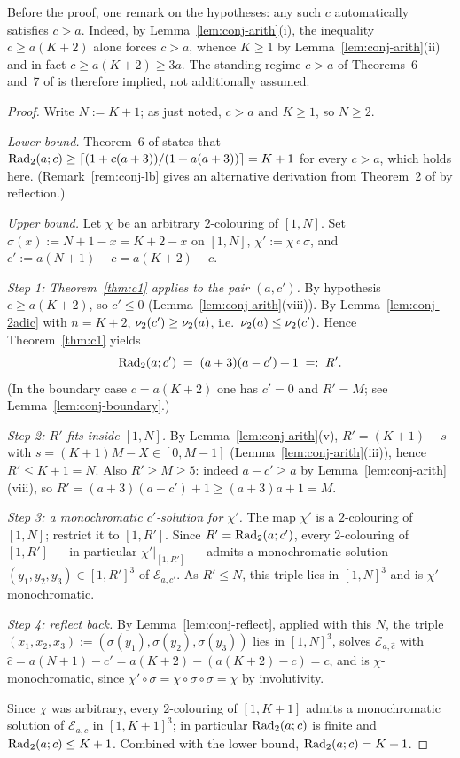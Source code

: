 Before the proof, one remark on the hypotheses: any such $c$ automatically
satisfies $c > a$. Indeed, by Lemma~\ref{lem:conj-arith}(i), the inequality
$c \ge a(K+2)$ alone forces $c > a$, whence $K \ge 1$ by
Lemma~\ref{lem:conj-arith}(ii) and in fact $c \ge a(K+2) \ge 3a$. The
standing regime $c > a$ of Theorems~6 and~7 of \cite{DT2020} is therefore
implied, not additionally assumed.

\begin{proof}
Write $N := K + 1$; as just noted, $c > a$ and $K \ge 1$, so $N \ge 2$.

\emph{Lower bound.} Theorem~6 of \cite{DT2020} states that
$\mathrm{Rad}_2(a;c) \ge \lceil (1 + c(a+3))/(1 + a(a+3)) \rceil = K + 1$ for every
$c > a$, which holds here. (Remark~\ref{rem:conj-lb} gives an alternative
derivation from Theorem~2 of \cite{DT2020} by reflection.)

\emph{Upper bound.} Let $\chi$ be an arbitrary $2$-colouring of $[1,N]$.
Set $\sigma(x) := N + 1 - x = K + 2 - x$ on $[1,N]$,
$\chi' := \chi \circ \sigma$, and $c' := a(N+1) - c = a(K+2) - c$.

\emph{Step 1: Theorem~\ref{thm:c1} applies to the pair $(a, c')$.} By
hypothesis $c \ge a(K+2)$, so $c' \le 0$
(Lemma~\ref{lem:conj-arith}(viii)). By Lemma~\ref{lem:conj-2adic} with
$n = K + 2$, $\nu_2(c') \ge \nu_2(a)$, i.e.\ $\nu_2(a) \le \nu_2(c')$.
Hence Theorem~\ref{thm:c1} yields
\[
\mathrm{Rad}_2(a;c') \;=\; (a+3)(a - c') + 1 \;=:\; R' .
\]
(In the boundary case $c = a(K+2)$ one has $c' = 0$ and $R' = M$; see
Lemma~\ref{lem:conj-boundary}.)

\emph{Step 2: $R'$ fits inside $[1,N]$.} By
Lemma~\ref{lem:conj-arith}(v), $R' = (K+1) - s$ with
$s = (K+1)M - X \in [0, M-1]$ (Lemma~\ref{lem:conj-arith}(iii)), hence
$R' \le K + 1 = N$. Also $R' \ge M \ge 5$: indeed $a - c' \ge a$ by
Lemma~\ref{lem:conj-arith}(viii), so
$R' = (a+3)(a - c') + 1 \ge (a+3)a + 1 = M$.

\emph{Step 3: a monochromatic $c'$-solution for $\chi'$.} The map $\chi'$
is a $2$-colouring of $[1,N]$; restrict it to $[1,R']$. Since
$R' = \mathrm{Rad}_2(a;c')$, every $2$-colouring of $[1,R']$ --- in particular
$\chi'|_{[1,R']}$ --- admits a monochromatic solution
$(y_1,y_2,y_3) \in [1,R']^3$ of $\mathcal{E}_{a,c'}$. As $R' \le N$, this
triple lies in $[1,N]^3$ and is $\chi'$-monochromatic.

\emph{Step 4: reflect back.} By Lemma~\ref{lem:conj-reflect}, applied with
this $N$, the triple
$(x_1,x_2,x_3) := (\sigma(y_1), \sigma(y_2), \sigma(y_3))$ lies in
$[1,N]^3$, solves $\mathcal{E}_{a,\hat c}$ with
$\hat c = a(N+1) - c' = a(K+2) - (a(K+2) - c) = c$, and is
$\chi$-monochromatic, since
$\chi' \circ \sigma = \chi \circ \sigma \circ \sigma = \chi$ by
involutivity.

Since $\chi$ was arbitrary, every $2$-colouring of $[1, K+1]$ admits a
monochromatic solution of $\mathcal{E}_{a,c}$ in $[1,K+1]^3$; in
particular $\mathrm{Rad}_2(a;c)$ is finite and $\mathrm{Rad}_2(a;c) \le K + 1$. Combined with
the lower bound, $\mathrm{Rad}_2(a;c) = K + 1$.
\end{proof}

